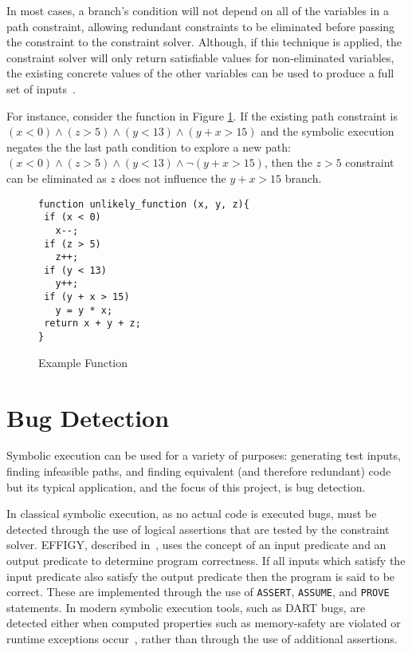 \documentclass[]{final_report}
\begin{document}
In most cases, a branch's condition will not depend on all of the variables in a path constraint, allowing redundant constraints to be eliminated before passing the constraint to the constraint solver. Although, if this technique is applied, the constraint solver will only return satisfiable values for non-eliminated variables, the existing concrete values of the other variables can be used to produce a full set of inputs~\cite{cadar2013symbolic}.

For instance, consider the function in Figure \ref{fig:example-function}. If the existing path constraint is $(x < 0 ) \land ( z > 5) \land (y < 13) \land (y + x > 15)$ and the symbolic execution negates the the last path condition to explore a new path: $ (x < 0) \land (z > 5) \land (y < 13) \land \lnot(y + x > 15)$, then the $z > 5$ constraint can be eliminated as $z$ does not influence the $y + x > 15$ branch.

\begin{figure}[t]
\begin{lstlisting}
function unlikely_function (x, y, z){
 if (x < 0)
   x--;
 if (z > 5)
   z++;
 if (y < 13)
   y++;
 if (y + x > 15)
   y = y * x;
 return x + y + z;
}
\end{lstlisting}
\caption{\label{fig:example-function} Example Function}
\end{figure} 

\section{Bug Detection}

Symbolic execution can be used for a variety of purposes: generating test inputs, finding infeasible paths, and finding equivalent (and therefore redundant) code but its typical application, and the focus of this project, is bug detection.

In classical symbolic execution, as no actual code is executed bugs, must be detected through the use of logical assertions that are tested by the constraint solver. EFFIGY, described in~\cite{king1976symbolic}, uses the concept of an input predicate and an output predicate to determine program correctness. If all inputs which satisfy the input predicate also satisfy the output predicate then the program is said to be correct. These are implemented through the use of \lstinline|ASSERT|, \lstinline|ASSUME|, and \lstinline|PROVE| statements. In modern symbolic execution tools, such as DART bugs, are detected either when computed properties such as memory-safety are violated or runtime exceptions occur~\cite{godefroid2005dart}, rather than through the use of additional assertions.
\end{document}
